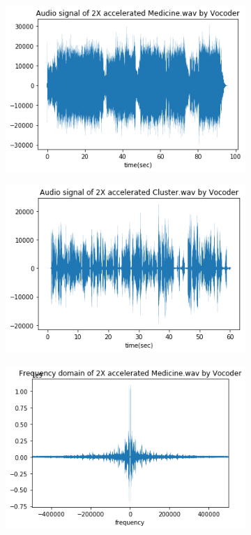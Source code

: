 \documentclass{article}
\begin{document}
\begin{figure}[h!]
\centering
    \begin{subfigure}{0.45\textwidth}
      \includegraphics[width=\textwidth]{Medicine_2X_Vocoder.png}
    \end{subfigure}%
    \begin{subfigure}{0.45\textwidth}
      \includegraphics[width=\textwidth]{Cluster_2X_Vocoder.png}
    \end{subfigure}
    \begin{subfigure}{0.45\textwidth}
      \includegraphics[width=\textwidth]{Medicine_2X_Vocoder_freq.png}

\end{subfigure}
\end{figure}
\end{document}
